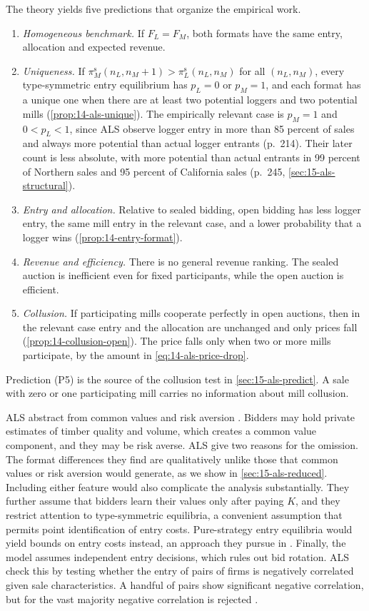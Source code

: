 The theory yields five predictions that organize the empirical work.
\begin{enumerate}[label=(P\arabic*)]
\item \emph{Homogeneous benchmark.} If $F_L=F_M$, both formats have the same entry, allocation and
expected revenue.
\item \emph{Uniqueness.} If $\pi^{\mathrm s}_M(n_L,n_M+1)>\pi^{\mathrm s}_L(n_L,n_M)$ for all
$(n_L,n_M)$, every type-symmetric entry equilibrium has $p_L=0$ or $p_M=1$, and each format has a unique one when
there are at least two potential loggers and two potential mills (\cref{prop:14-als-unique}). The empirically relevant case is $p_M=1$ and $0<p_L<1$, since ALS observe
logger entry in more than 85 percent of sales and always more potential than actual logger entrants
(p.~214). Their later count is less absolute, with more potential than actual entrants in 99 percent of
Northern sales and 95 percent of California sales (p.~245, \cref{sec:15-als-structural}).
\item \emph{Entry and allocation.} Relative to sealed bidding, open bidding has less logger entry, the
same mill entry in the relevant case, and a lower probability that a logger wins
(\cref{prop:14-entry-format}).
\item \emph{Revenue and efficiency.} There is no general revenue ranking. The sealed auction is
inefficient even for fixed participants, while the open auction is efficient.
\item \emph{Collusion.} If participating mills cooperate perfectly in open auctions, then in the relevant
case entry and the allocation are unchanged and only prices fall (\cref{prop:14-collusion-open}). The
price falls only when two or more mills participate, by the amount in \eqref{eq:14-als-price-drop}.
\end{enumerate}
Prediction (P5) is the source of the collusion test in \cref{sec:15-als-predict}. A sale with zero or one
participating mill carries no information about mill collusion.

ALS abstract from common values and risk aversion \citep[Section II.F]{AtheyLevinSeira2011}. Bidders may
hold private estimates of timber quality and volume, which creates a common value component, and they
may be risk averse. ALS give two reasons for the omission. The format differences they find are
qualitatively unlike those that common values or risk aversion would generate, as we show in
\cref{sec:15-als-reduced}. Including either feature would also complicate the analysis substantially.
They further assume that bidders learn their values only after paying $K$, and they restrict attention to
type-symmetric equilibria, a convenient assumption that permits point identification of entry costs.
Pure-strategy entry equilibria would yield bounds on entry costs instead, an approach they pursue in
\citet{AtheyCoeyLevin2013}. Finally, the model assumes independent entry decisions, which rules out bid
rotation. ALS check this by testing whether the entry of pairs of firms is negatively correlated given
sale characteristics. A handful of pairs show significant negative correlation, but for the vast
majority negative correlation is rejected \citep[footnote 5]{AtheyLevinSeira2011}.

